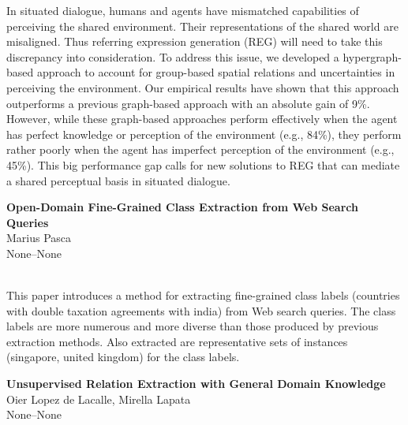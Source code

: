 \documentclass[twoside,makeidx]{book}
\renewcommand{\normalsize}{\fontsize{8}{9}\selectfont}
\renewcommand{\small}{\fontsize{7}{8}\selectfont}
\begin{document}
\nopagebreak%
\noindent%
{\small In situated dialogue, humans and agents have mismatched capabilities of perceiving the shared environment. Their representations of the shared world are misaligned. Thus referring expression generation (REG) will need to take this discrepancy into consideration. To address this issue, we developed a hypergraph-based approach to account for group-based spatial relations and uncertainties in perceiving the environment. Our empirical results have shown that this approach outperforms a previous graph-based approach with an absolute gain of 9\%. However, while these graph-based approaches perform effectively when the agent has perfect knowledge or perception of the environment (e.g., 84\%), they perform rather poorly when the agent has imperfect perception of the environment (e.g., 45\%). This big performance gap calls for new solutions to REG that can mediate a shared perceptual basis in situated dialogue.}
\par\vspace{2em}\noindent%
\begin{minipage}{\linewidth}%
\begin{center}
\textbf{\normalsize Open-Domain Fine-Grained Class Extraction from Web Search Queries}\\
\normalsize  Marius Pasca\\
{\small None--None}\\
\end{center}
\end{minipage}\\[0.5em]
\nopagebreak%
\noindent%
{\small This paper introduces a method for extracting fine-grained class labels (countries with double taxation agreements with india) from Web search queries. The class labels are more numerous and more diverse than those produced by previous extraction methods. Also extracted are representative sets of instances (singapore, united kingdom) for the class labels.}
\par\vspace{2em}\noindent%
\begin{minipage}{\linewidth}%
\begin{center}
\textbf{\normalsize Unsupervised Relation Extraction with General Domain Knowledge}\\
\normalsize  Oier Lopez de Lacalle,  Mirella Lapata\\
{\small None--None}\\
\end{center}
\end{minipage}\\[0.5em]
\end{document}
